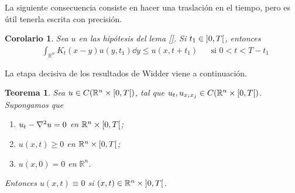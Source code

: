 \documentclass{article}
\newcommand{\realNumbers}{\mathbb{R}}
\newtheorem{theorem}{Teorema}
\newtheorem{corollary}{Corolario}
\theoremstyle{definition}
\theoremstyle{remark}
\newcommand{\leftOpenInterval}{\left]}
\newcommand{\rightOpenInterval}{\right[}
\newcommand{\leftClosedInterval}{\left[}
\newcommand{\rightClosedInterval}{\right]}
\newcommand{\interval}[3]{%
  \ifstrequal{#1}{oo}{%
    \leftOpenInterval #2, #3 \rightOpenInterval%
  }{%
    \ifstrequal{#1}{co}{%
      \leftClosedInterval #2, #3 \rightOpenInterval%
    }{%
      \ifstrequal{#1}{oc}{
        \leftOpenInterval #2, #3 \rightClosedInterval%
      }{%
        \ifstrequal{#1}{cc}{
          \leftClosedInterval #2, #3 \rightClosedInterval
        }{%
        }%
      }%
    }%
  }%
}
\begin{document}
  La siguiente consecuencia consiste en hacer una traslación en el tiempo, pero es útil tenerla escrita con precisión.

  \begin{corollary}
    Sea \(u\) en las hipótesis del lema \ref{}.  %
    Si \(t_1 \in \interval{oo}{0}{T}\), entonces
    \begin{align}
      &\int_{\realNumbers^n} K_t(x - y) u(y, t_1) \dd y
      \leq
      u(x, t + t_1)
      && \text{si } 0 < t < T - t_1
    \end{align}
  \end{corollary}

  La etapa decisiva de los resultados de Widder viene a continuación.
  \begin{theorem}
    Sea \(u \in C(\realNumbers^n \times \interval{co}{0}{T})\), tal que \(u_t, u_{x_i x_j} \in C(\realNumbers^n \times \interval{co}{0}{T})\).
    Supongamos que
    \begin{enumerate}
      \item \(u_t - \laplacian u = 0\) en \(\realNumbers^n \times \interval{co}{0}{T}\);
      \item \(u(x, t) \geq 0\) en \(\realNumbers^n \times \interval{co}{0}{T}\);
      \item \(u(x, 0) = 0\) en \(\realNumbers^n\).
    \end{enumerate}
    Entonces \(u(x, t) \equiv 0\) si \((x, t) \in \realNumbers^n \times \interval{oo}{0}{T}\).
  \end{theorem}
\end{document}
